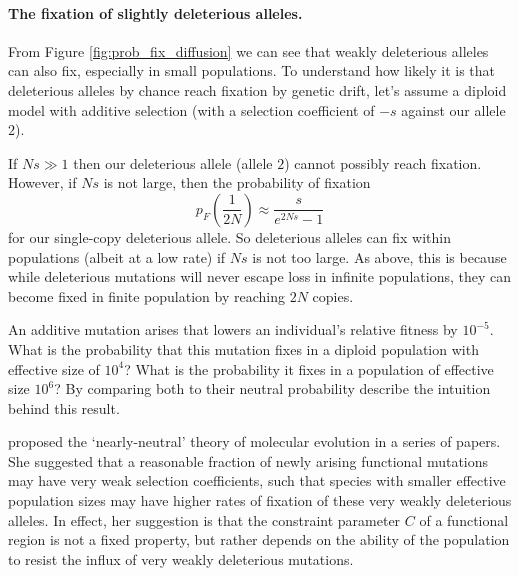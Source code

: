 {\paragraph{The fixation of slightly deleterious alleles.}
From Figure \ref{fig:prob_fix_diffusion} we can see that weakly
deleterious alleles can also fix, especially in small populations.  To understand how
likely it is that deleterious alleles by chance reach fixation by
genetic drift, let's assume a diploid model with additive selection (with
a selection coefficient of $-s$ against our allele $2$).  

If $N s \gg 1$ then our deleterious allele (allele $2$) cannot possibly reach
fixation. However, if $Ns$ is not large, then the probability of fixation
\begin{equation}
p_F \left( \frac{1}{2N} \right) \approx \frac{s}{e^{2Ns}-1} \label{eqn:fix_deleterious}
\end{equation}
for our single-copy deleterious allele. So deleterious alleles can fix within
populations (albeit at a low rate) if $Ns$ is not too large. As above,
this is because while deleterious mutations will never escape loss in
infinite populations, they can become fixed in finite population by
reaching $2N$ copies. 

\begin{question}
An additive mutation arises that lowers an individual's relative fitness by
$10^{-5}$. What is the probability that this mutation fixes in a
diploid population with effective size of $10^4$? What is the probability it
fixes in a population of effective size $10^6$? By comparing both to their neutral probability describe the
intuition behind this result.
\end{question}

\citeauthor{ohta1973slightly}
proposed the `nearly-neutral' theory of
molecular evolution in a series of papers\cite{ohta1972population,ohta1973slightly,ohta1987very}. She suggested that a reasonable fraction of newly
arising functional mutations may have very weak selection
coefficients, such that species with smaller effective population sizes may
have higher rates of fixation of these very weakly deleterious
alleles. In effect, her suggestion is that the constraint parameter
$C$ of a functional region is not a fixed property, but rather depends
on the ability of the population to resist the influx of very weakly
deleterious mutations. 


}

